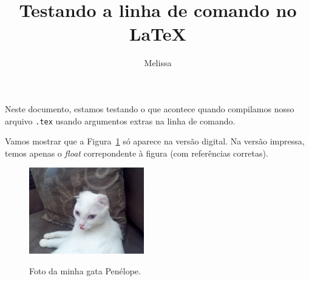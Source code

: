 \documentclass[a4,12pt]{article}
\title{Testando a linha de comando no \LaTeX}
\author{Melissa}
\providecommand\sendtoprinter{false}
\begin{document}
\maketitle

Neste documento, estamos testando o que acontece quando compilamos nosso arquivo \verb+.tex+ usando argumentos extras na linha de comando.

Vamos mostrar que a Figura~\ref{fig:penelope} só aparece na versão digital. Na versão impressa, temos apenas o \emph{float} correpondente à figura (com referências corretas).

\begin{figure}[!h]
   \begin{center}
      \ifthenelse{\equal{\sendtoprinter}{true}}
      {
      } %
      { %
        \includegraphics[width=5cm]{penelope.jpg}
      } %
      \caption{Foto da minha gata Penélope.\label{fig:penelope}}
   \end{center}
\end{figure}
   
\end{document}
